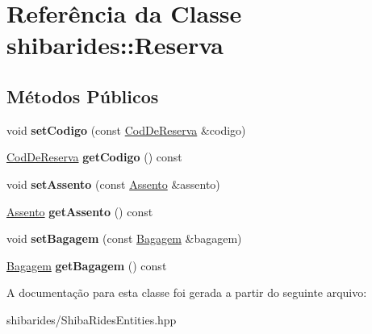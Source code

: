 \hypertarget{classshibarides_1_1Reserva}{}\section{Referência da Classe shibarides\+:\+:Reserva}
\label{classshibarides_1_1Reserva}
\subsection*{Métodos Públicos}
\begin{DoxyCompactItemize}
\item 
void {\bfseries set\+Codigo} (const \hyperlink{classshibarides_1_1CodDeReserva}{Cod\+De\+Reserva} \&codigo)\hypertarget{classshibarides_1_1Reserva_a8f2e70e8f8e6a0b739731c3ddaca1e2f}{}\label{classshibarides_1_1Reserva_a8f2e70e8f8e6a0b739731c3ddaca1e2f}

\item 
\hyperlink{classshibarides_1_1CodDeReserva}{Cod\+De\+Reserva} {\bfseries get\+Codigo} () const \hypertarget{classshibarides_1_1Reserva_a707e6f4248e3ee1ed8f0c1e3893c834d}{}\label{classshibarides_1_1Reserva_a707e6f4248e3ee1ed8f0c1e3893c834d}

\item 
void {\bfseries set\+Assento} (const \hyperlink{classshibarides_1_1Assento}{Assento} \&assento)\hypertarget{classshibarides_1_1Reserva_a9013c5f1d6638ccc77e4a37071409d9b}{}\label{classshibarides_1_1Reserva_a9013c5f1d6638ccc77e4a37071409d9b}

\item 
\hyperlink{classshibarides_1_1Assento}{Assento} {\bfseries get\+Assento} () const \hypertarget{classshibarides_1_1Reserva_a9a2c89b1c70b8ad4dc8124a229c5c8ca}{}\label{classshibarides_1_1Reserva_a9a2c89b1c70b8ad4dc8124a229c5c8ca}

\item 
void {\bfseries set\+Bagagem} (const \hyperlink{classshibarides_1_1Bagagem}{Bagagem} \&bagagem)\hypertarget{classshibarides_1_1Reserva_aaef804b78d7ae0979d38625f29ee7a09}{}\label{classshibarides_1_1Reserva_aaef804b78d7ae0979d38625f29ee7a09}

\item 
\hyperlink{classshibarides_1_1Bagagem}{Bagagem} {\bfseries get\+Bagagem} () const \hypertarget{classshibarides_1_1Reserva_a427286c7b59a6cf0ea17bd9cb8165139}{}\label{classshibarides_1_1Reserva_a427286c7b59a6cf0ea17bd9cb8165139}

\end{DoxyCompactItemize}


A documentação para esta classe foi gerada a partir do seguinte arquivo\+:\begin{DoxyCompactItemize}
\item 
shibarides/Shiba\+Rides\+Entities.\+hpp\end{DoxyCompactItemize}
